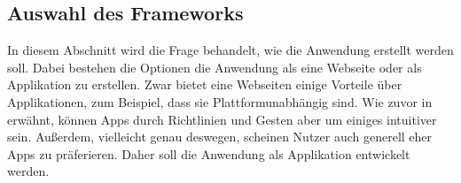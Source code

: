\subsection{Auswahl des Frameworks}\label{subsection:auswahlDesFrameworks}\myCheckmark%
In diesem Abschnitt wird die Frage behandelt, wie die Anwendung erstellt werden soll. %
Dabei bestehen die Optionen die Anwendung als eine Webseite oder als Applikation zu erstellen. %
	Zwar bietet eine Webseiten einige Vorteile über Applikationen, zum Beispiel, dass sie Plattformunabhängig sind. Wie zuvor in  erwähnt, können Apps durch Richtlinien und Gesten aber um einiges intuitiver sein. Außerdem, vielleicht genau deswegen, scheinen Nutzer auch generell eher Apps zu präferieren\cite{pcVsphone_mobileAppVsWebTimeSpent}. %
	Daher soll die Anwendung als Applikation entwickelt werden. %

